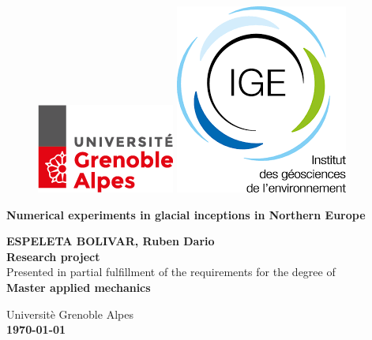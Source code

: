 \thispagestyle{empty}
\begin{center}
    	\begin{figure} [t]
		\includegraphics[width=0.2\linewidth]{../fig/logo_UGA.png}
		\hspace{8.0cm}
		\includegraphics[width=0.2\linewidth]{../fig/logo_IGE.png}
		\vspace{2.0cm}
	    \end{figure}

        \begin{Large}
        \textbf{Numerical experiments in glacial inceptions in Northern Europe} 
        \end{Large}
        
        \vspace{0.8cm}
        \textbf{ESPELETA BOLIVAR, Ruben Dario}\\
        \vspace{3.0cm}
        \textbf{Research project}\\
	    Presented in partial fulfillment of the requirements for the degree of\\
	    \textbf{Master applied mechanics}\\
        \vspace{3.0cm}

        Universitè Grenoble Alpes\\
        \textbf{\today}
        \vspace{4.0cm}
\end{center}
\clearpage
